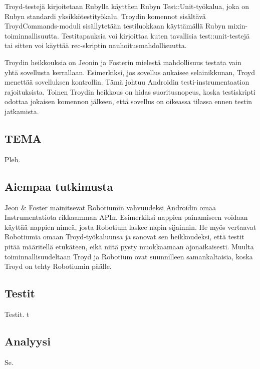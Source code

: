 Troyd-testejä kirjoitetaan Rubylla käyttäen Rubyn Test::Unit-työkalua, joka on Rubyn standardi yksikkötestityökalu. \cite{testunit} Troydin komennot sisältävä TroydCommands-moduli sisällytetään testiluokkaan käyttämällä Rubyn mixin-toiminnallisuutta. Testitapauksia voi kirjoittaa kuten tavallisia test::unit-testejä tai sitten voi käyttää rec-skriptin nauhoitusmahdollisuutta.

Troydin heikkouksia on Jeonin ja Fosterin mielestä mahdollisuus testata vain yhtä sovellusta kerrallaan. Esimerkiksi, jos sovellus aukaisee selainikkunan, Troyd menettää sovelluksen kontrollin. Tämä johtuu Androidin testi-instrumentaation rajoituksista. Toinen Troydin heikkous on hidas suoritusnopeus, koska testiskripti odottaa jokaisen komennon jälkeen, että sovellus on oikeassa tilassa ennen testin jatkamista. \cite{troyd}

\subsection{TEMA}

Pleh.

\subsection{Aiempaa tutkimusta}

Jeon \& Foster mainitsevat Robotiumin vahvuudeksi Androidin omaa Instrumentatiota rikkaamman APIn. Esimerkiksi nappien painamiseen voidaan käyttää nappien nimeä, josta Robotium laskee napin sijainnin. He myös vertaavat Robotiumia omaan Troyd-työkaluunsa ja sanovat sen heikkoudeksi, että testit pitää määritellä etukäteen, eikä niitä pysty muokkaamaan ajonaikaisesti. Muulta toiminnallisuudeltaan Troyd ja Robotium ovat suunnilleen samankaltaisia, koska Troyd on tehty Robotiumin päälle. \cite{troyd}

\subsection{Testit}

Testit. t

\subsection{Analyysi}

Se.